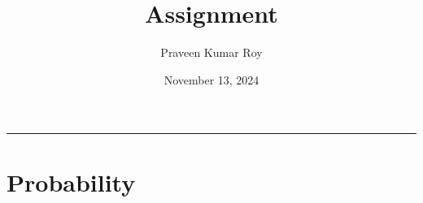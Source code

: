 \documentclass[11pt,twoside,reqno]{article}
\date{November 13, 2024}
\begin{document}
\title{Assignment}
\author{Praveen Kumar Roy}
\maketitle
\hrule


\section{Probability}

\begin{comment}
({\bf Answer-1}) $N$ takes on values from the set $\{1,2,3,\ldots \}$ with 
\begin{eqnarray*}
P(N = 1) &=& P(\{H\}) = \frac{1}{2}, \\
P(N = 2) &=& P(\{TH\}) = \frac{1}{2}\cdot \frac{1}{2} \\
&...& \\
P(N = k) &=& P(\{T...TH\}) = \left(\frac{1}{2}\right)^{k-1}\cdot \frac{1}{2}.
\end{eqnarray*}
Therefore, $N$ is a geometric random variable and its expectation is 
\begin{eqnarray*}
E[N] = \sum\limits_{k=1}^{\infty} kP(N=k) = \sum\limits_{k=1}^{\infty} k \left(\frac{1}{2}\right)^{k-1}\cdot \frac{1}{2} =  \sum\limits_{k=1}^{\infty} k \left(\frac{1}{2}\right)^{k}.
\end{eqnarray*}
Substituting $s := \sum\limits_{k=1}^{\infty} k \left(\frac{1}{2}\right)^{k}$, we observe 
\begin{eqnarray*}
s = \frac{1}{2}\left(s + \left(1-\frac{1}{2}\right)^{-1}\right),
\end{eqnarray*}
which gives $E[N] = s = 2$.\\
Variance of $N$ is given by $\sigma^2 : = {\rm Var}(N) = E[(N - E[N])^2] = E[N^2] - 4E[N] + 4 = E[N^2] - 4$. Now using the identity 
\[
\sum_{k=1}^{\infty} k^2 x^k = \frac{x(1+x)}{(1-x)^3}
\]
we get $E[N^2] = 6$. Therefore, $\sigma^2 = 2$ and the standard deviation $\sigma = \sqrt{2}$.\\ \\ 
({\bf Answer-2}) 
(a) If $Y= 5X + 10$, then 
\begin{eqnarray*}
F_Y(a) = P(Y\leq a) = P(5X + 10 \leq a) = P(X \leq \frac{a-10}{5}) = F_X\left(\frac{a-10}{5}\right) = \int_{0}^{\frac{a-10}{5}} \frac{1}{5}dx. 
\end{eqnarray*}
Substituting $v = 5x + 10$, we get $dv = 5 dx$. The above integral now becomes:
\[
F_Y(a) = \int_{10}^{a} \frac{1}{5}\cdot \frac{1}{5}dv = \int_{10}^{a} \frac{1}{25}dv.
\]
Therefore, the probability density functions of $Y$ is 

\end{comment}
\end{document}
